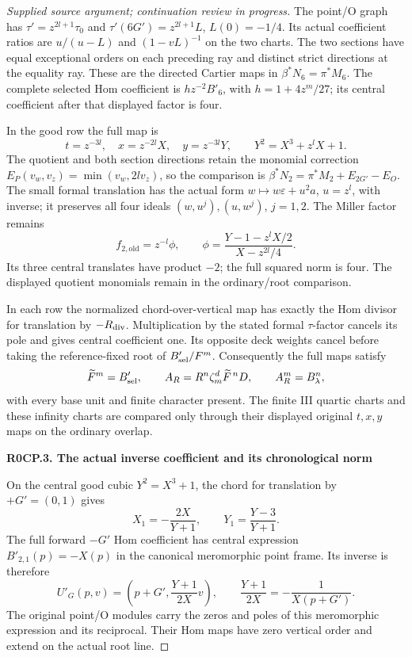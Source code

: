 \begin{proof}[Supplied source argument; continuation review in progress]
The point/O graph has \(\tau'=z^{2l+1}\tau_0\) and
\(\tau'(6G')=z^{2l+1}L\), \(L(0)=-1/4\). Its actual coefficient
ratios are \(u/(u-L)\) and \((1-vL)^{-1}\) on the two charts.
The two sections have equal exceptional orders on each preceding
ray and distinct strict directions at the equality ray. These
are the directed Cartier maps in
\(\beta^*N_6=\pi^*M_6\). The complete selected Hom coefficient is
\(h z^{-2}B'_6\), with \(h=1+4z^m/27\); its central coefficient
after that displayed factor is four.

In the good row the full map is
\[
 t=z^{-3l},\quad x=z^{-2l}X,\quad y=z^{-3l}Y,
 \qquad Y^2=X^3+z^lX+1.
\]
The quotient and both section directions retain the monomial
correction
\(E_P(v_w,v_z)=\min(v_w,2l v_z)\), so the comparison is
\(\beta^*N_2=\pi^*M_2+E_{2G'}-E_O\).
The small formal translation has the actual form
\(w\mapsto w\varepsilon+u^2a\), \(u=z^l\), with inverse;
it preserves all four ideals \((w,u^j),(u,w^j)\), \(j=1,2\).
The Miller factor remains
\[
 f_{2,\mathrm{old}}=z^{-l}\phi,\qquad
 \phi=\frac{Y-1-z^lX/2}{X-z^{2l}/4}.
\]
Its three central translates have product \(-2\); the full squared
norm is four. The displayed quotient monomials remain in the
ordinary/root comparison.

In each row the normalized chord-over-vertical map has exactly the
Hom divisor for translation by \(-R_{\rm div}\). Multiplication by
the stated formal \(\tau\)-factor cancels its pole and gives central
coefficient one. Its opposite deck weights cancel before taking the
reference-fixed root of \(B'_{\rm sel}/F^m\). Consequently the full
maps satisfy
\[
 \widetilde F^m=B'_{\rm sel},\qquad
 A_R=R^n\zeta_m^d\widetilde F^{\,n}D,\qquad
 A_R^m=B_\lambda^n,
\]
with every base unit and finite character present. The finite III
quartic charts and these infinity charts are compared only through
their displayed original \(t,x,y\) maps on the ordinary overlap.

\par

\medskip\noindent\textbf{R0CP.3. The actual inverse coefficient and its chronological norm}

\par\nobreak

On the central good cubic \(Y^2=X^3+1\), the chord for translation
by \(+G'=(0,1)\) gives
\[
 X_1=-\frac{2X}{Y+1},\qquad Y_1=\frac{Y-3}{Y+1}.
 \tag{R0CP.1}
\]
The full forward \(-G'\) Hom coefficient has central expression
\(B'_{2,1}(p)=-X(p)\) in the canonical meromorphic point frame.
Its inverse is therefore
\[
 U'_G(p,v)=
 \left(p+G',\frac{Y+1}{2X}v\right),
 \qquad
 \frac{Y+1}{2X}=-\frac1{X(p+G')}.
 \tag{R0CP.2}
\]
The original point/O modules carry the zeros and poles of this
meromorphic expression and its reciprocal. Their Hom maps have
zero vertical order and extend on the actual root line.


\end{proof}
